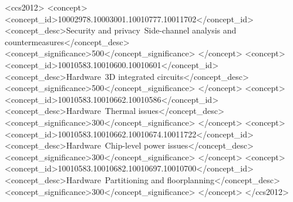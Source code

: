 %
\begin{CCSXML}
<ccs2012>
<concept>
<concept_id>10002978.10003001.10010777.10011702</concept_id>
<concept_desc>Security and privacy~Side-channel analysis and countermeasures</concept_desc>
<concept_significance>500</concept_significance>
</concept>
<concept>
<concept_id>10010583.10010600.10010601</concept_id>
<concept_desc>Hardware~3D integrated circuits</concept_desc>
<concept_significance>500</concept_significance>
</concept>
<concept>
<concept_id>10010583.10010662.10010586</concept_id>
<concept_desc>Hardware~Thermal issues</concept_desc>
<concept_significance>300</concept_significance>
</concept>
<concept>
<concept_id>10010583.10010662.10010674.10011722</concept_id>
<concept_desc>Hardware~Chip-level power issues</concept_desc>
<concept_significance>300</concept_significance>
</concept>
<concept>
<concept_id>10010583.10010682.10010697.10010700</concept_id>
<concept_desc>Hardware~Partitioning and floorplanning</concept_desc>
<concept_significance>300</concept_significance>
</concept>
</ccs2012>
\end{CCSXML}


\printccsdesc

